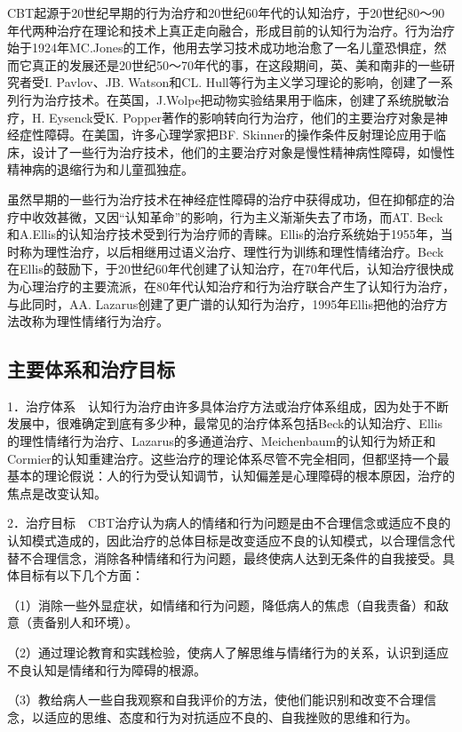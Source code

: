 CBT起源于20世纪早期的行为治疗和20世纪60年代的认知治疗，于20世纪80～90年代两种治疗在理论和技术上真正走向融合，形成目前的认知行为治疗。行为治疗始于1924年MC.Jones的工作，他用去学习技术成功地治愈了一名儿童恐惧症，然而它真正的发展还是20世纪50～70年代的事，在这段期间，英、美和南非的一些研究者受I.
Pavlov、JB. Watson和CL.
Hull等行为主义学习理论的影响，创建了一系列行为治疗技术。在英国，J.Wolpe把动物实验结果用于临床，创建了系统脱敏治疗，H.
Eysenck受K.
Popper著作的影响转向行为治疗，他们的主要治疗对象是神经症性障碍。在美国，许多心理学家把BF.
Skinner的操作条件反射理论应用于临床，设计了一些行为治疗技术，他们的主要治疗对象是慢性精神病性障碍，如慢性精神病的退缩行为和儿童孤独症。

虽然早期的一些行为治疗技术在神经症性障碍的治疗中获得成功，但在抑郁症的治疗中收效甚微，又因“认知革命”的影响，行为主义渐渐失去了市场，而AT.
Beck和A.Ellis的认知治疗技术受到行为治疗师的青睐。Ellis的治疗系统始于1955年，当时称为理性治疗，以后相继用过语义治疗、理性行为训练和理性情绪治疗。Beck在Ellis的鼓励下，于20世纪60年代创建了认知治疗，在70年代后，认知治疗很快成为心理治疗的主要流派，在80年代认知治疗和行为治疗联合产生了认知行为治疗，与此同时，AA.
Lazarus创建了更广谱的认知行为治疗，1995年Ellis把他的治疗方法改称为理性情绪行为治疗。

\subsection{主要体系和治疗目标}

1．治疗体系　认知行为治疗由许多具体治疗方法或治疗体系组成，因为处于不断发展中，很难确定到底有多少种，最常见的治疗体系包括Beck的认知治疗、Ellis的理性情绪行为治疗、Lazarus的多通道治疗、Meichenbaum的认知行为矫正和Cormier的认知重建治疗。这些治疗的理论体系尽管不完全相同，但都坚持一个最基本的理论假说：人的行为受认知调节，认知偏差是心理障碍的根本原因，治疗的焦点是改变认知。

2．治疗目标　CBT治疗认为病人的情绪和行为问题是由不合理信念或适应不良的认知模式造成的，因此治疗的总体目标是改变适应不良的认知模式，以合理信念代替不合理信念，消除各种情绪和行为问题，最终使病人达到无条件的自我接受。具体目标有以下几个方面：

（1）消除一些外显症状，如情绪和行为问题，降低病人的焦虑（自我责备）和敌意（责备别人和环境）。

（2）通过理论教育和实践检验，使病人了解思维与情绪行为的关系，认识到适应不良认知是情绪和行为障碍的根源。

（3）教给病人一些自我观察和自我评价的方法，使他们能识别和改变不合理信念，以适应的思维、态度和行为对抗适应不良的、自我挫败的思维和行为。

